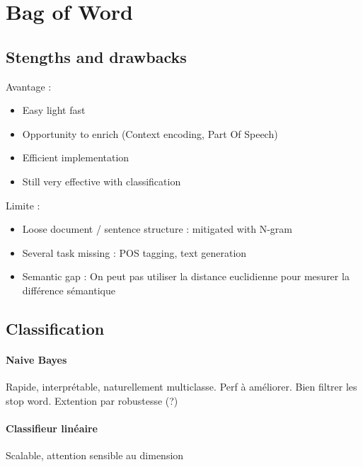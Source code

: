 \documentclass{article}
\theoremstyle{plain}%
\theoremstyle{definition}
\theoremstyle{remark}
\begin{document}
\section{Bag of Word}

\subsection{Stengths and drawbacks}
Avantage : 
\begin{itemize}
    \item Easy light fast 
    \item Opportunity to enrich (Context encoding, Part Of Speech)
    \item Efficient implementation
    \item Still very effective with classification
\end{itemize}
Limite : 
\begin{itemize}
    \item Loose document / sentence structure : mitigated with N-gram
    \item Several task missing : POS tagging, text generation
    \item Semantic gap : On peut pas utiliser la distance euclidienne pour mesurer la différence sémantique
\end{itemize}

\subsection{Classification}
\paragraph*{Naive Bayes}
Rapide, interprétable, naturellement multiclasse. Perf à améliorer. Bien filtrer les stop word. Extention par robustesse (?)

\paragraph*{Classifieur linéaire}
Scalable, attention sensible au dimension
\end{document}
